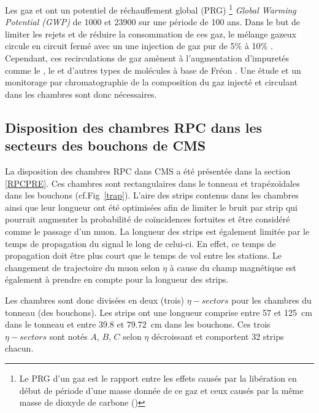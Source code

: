 Les gaz  et  ont un  potentiel de réchauffement global (PRG) \footnote{Le PRG d’un gaz est le rapport entre les effets causés par la libération en début de période d’une masse donnée de ce gaz et ceux causés par la même masse de dioxyde de carbone ()} \textit{Global Warming Potential (GWP)} de \num{1000} et \num{23900} sur une période de \num{100} ans. Dans le but de limiter les rejets et de réduire la consommation de ces gaz, le mélange gazeux circule en circuit fermé avec un une injection de gaz pur de \num{5}\% à \num{10}\% \cite{5401780}. Cependant, ces recirculations de gaz amènent à l'augmentation d'impuretés comme le , le  et d'autres types de molécules à base de Fréon \cite{1748-0221-8-08-T08003}. Une étude et un monitorage par chromatographie de la composition du gaz injecté et circulant dans les chambres sont donc nécessaires. 

\subsection{Disposition des chambres RPC dans les secteurs des bouchons de CMS}
\vspace{-0.2cm}
La disposition des chambres RPC dans CMS a été présentée dans la section \ref{RPCPRE}. Ces chambres sont rectangulaires dans le tonneau et trapézoïdales dans les bouchons (cf.Fig~\ref{trap}). L'aire des strips contenus dans les chambres ainsi que leur longueur ont été optimisées afin de limiter le bruit par strip qui pourrait augmenter la probabilité de coïncidences fortuites et être considéré comme le passage d'un muon. La longueur des strips est également limitée par le temps de propagation du signal le long de celui-ci. En effet, ce temps de propagation doit être plus court que le temps de vol entre les stations. Le changement de trajectoire du muon selon $\eta$ à cause du champ magnétique est également à prendre en compte pour la longueur des strips.

Les chambres sont donc divisées en deux (trois) $\eta-sectors$ pour les chambres du tonneau (des bouchons). Les strips ont une longueur comprise entre \num{57} et \SI{125}{\centi\meter} dans le tonneau et entre \num{39.8} et \SI{79.72}{\centi\meter} dans les bouchons. Ces trois $\eta-sectors$ sont notés $A$, $B$, $C$ selon $\eta$ décroissant et comportent \num{32} strips chacun.

